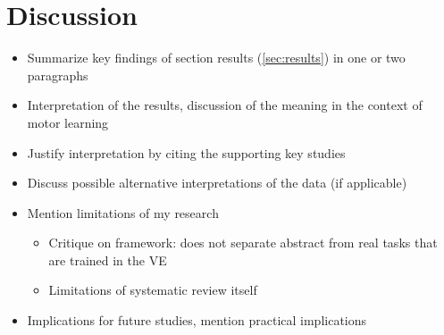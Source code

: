 \newpage

\section{Discussion}
\begin{itemize}
    \item Summarize key findings of section results (\ref{sec:results}) in one or two paragraphs
    \item Interpretation of the results, discussion of the meaning in the context of motor learning
    \item Justify interpretation by citing the supporting key studies
    \item Discuss possible alternative interpretations of the data (if applicable)
    \item Mention limitations of my research 
    \begin{itemize}
        \item Critique on framework: does not separate abstract from real tasks that are trained in the VE
        \item Limitations of systematic review itself
    \end{itemize}
    \item Implications for future studies, mention practical implications
\end{itemize}


